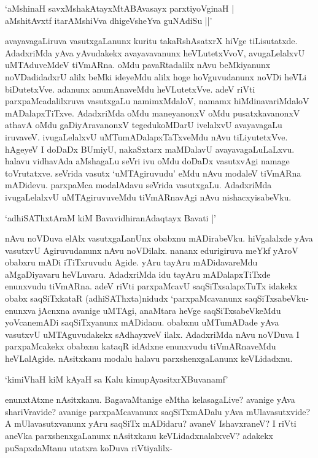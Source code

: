 \begin{shloka}
`aMshinaH savxMshakAtayxMtABAvasayx parxtiyoVginaH |\\
aMshitAvxtf itarAMshiVva dhigeVsheYva guNAdiSu ||'
\end{shloka}

avayavagaLiruva vasutxgaLanunx kuritu takaRshAsatxrX hiVge tiLisutatxde. AdadxriMda yAva yAvudakekx avayavavanunx heVLutetxVvoV, avugaLelalxvU uMTAduveMdeV tiVmARna. oMdu pavaRtadalilx nAvu beMkiyanunx noVDadidadxrU alilx beMki ideyeMdu alilx hoge hoVguvudanunx noVDi heVLi biDutetxVve. adanunx anumAnaveMdu heVLutetxVve. adeV riVti parxpaMcadalilxruva vasutxgaLu namimxMdaloV, namamx hiMdinavariMdaloV mADalapxTiTxve. AdadxriMda oMdu maneyanonxV oMdu pusatxkavanonxV athavA oMdu gaDiyAravanonxV tegedukoMDarU ivelalxvU avayavagaLu iruvaveV. ivugaLelalxvU uMTumADalapxTaTxveMdu nAvu tiLiyutetxVve. hAgeyeV I doDaDx BUmiyU, nakaSxtarx maMDalavU avayavagaLuLaLxvu. halavu vidhavAda aMshagaLu seVri ivu oMdu doDaDx vasutxvAgi namage toVrutatxve. seVrida vasutx `uMTAgiruvudu' eMdu nAvu modaleV tiVmARna mADidevu. parxpaMca modalAdavu seVrida vasutxgaLu. AdadxriMda ivugaLelalxvU uMTAgiruvuveMdu tiVmARnavAgi nAvu nishacxyisabeVku.

\begin{shloka}
`adhiSAThxtAraM kiM BavavidhiranAdaqtayx Bavati |'
\end{shloka}

nAvu noVDuva elAlx vasutxgaLanUnx obabxnu mADirabeVku. hiVgalalxde yAva vasutxvU Agiruvudanunx nAvu noVDilalx. nananx edurigiruva meYkf yAroV obabxru mADi iTiTxruvudu Agide. yAru tayAru mADidavareMdu aMgaDiyavaru heVLuvaru. AdadxriMda idu tayAru mADalapxTiTxde enunxvudu tiVmARna. adeV riVti parxpaMcavU saqSiTxsalapxTuTx idakekx obabx saqSiTxkataR (adhiSAThxta)nidudx `parxpaMcavanunx saqSiTxsabeVku- enunxva jAcnxna avanige uMTAgi, anaMtara heVge saqSiTxsabeVkeMdu yoVcanemADi saqSiTxyanunx mADidanu. obabxnu uMTumADade yAva vasutxvU uMTAguvudakekx sAdhayxveV ilalx. AdadxriMda nAvu noVDuva I parxpaMcakekx obabxnu kataqR idAdxne enunxvudu tiVmARnaveMdu heVLalAgide. nAsitxkanu modalu halavu parxshenxgaLanunx keVLidadxnu.

\begin{shloka}
`kimiVhaH kiM kAyaH sa Kalu kimupAyasitxrXBuvanamf'
\end{shloka}

enunxtAtxne nAsitxkanu. BagavaMtanige eMtha kelasagaLive? avanige yAva shariVravide? avanige parxpaMcavanunx saqSiTxmADalu yAva mUlavasutxvide? A mUlavasutxvanunx yAru saqSiTx mADidaru? avaneV IshavxraneV? I riVti aneVka parxshenxgaLanunx nAsitxkanu keVLidadxnalalxveV? adakekx puSapxdaMtanu utatxra koDuva riVtiyalilx-

